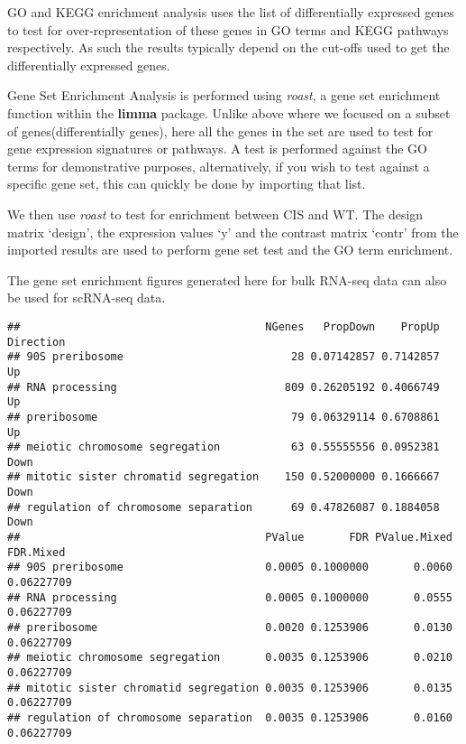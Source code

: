 \documentclass[
  openany]{book}
\newenvironment{Shaded}{\begin{snugshade}}{\end{snugshade}}
\newcommand{\AttributeTok}[1]{\textcolor[rgb]{0.77,0.63,0.00}{#1}}
\newcommand{\FunctionTok}[1]{\textcolor[rgb]{0.00,0.00,0.00}{#1}}
\newcommand{\NormalTok}[1]{#1}
\newcommand{\OtherTok}[1]{\textcolor[rgb]{0.56,0.35,0.01}{#1}}
\newcommand{\SpecialCharTok}[1]{\textcolor[rgb]{0.00,0.00,0.00}{#1}}
\begin{document}
GO and KEGG enrichment analysis uses the list of differentially expressed genes to test for over-representation of these genes in GO terms and KEGG pathways respectively. As such the results typically depend on the cut-offs used to get the differentially expressed genes.

Gene Set Enrichment Analysis is performed using \emph{roast}, a gene set enrichment function within the \textbf{limma} package. Unlike above where we focused on a subset of genes(differentially genes), here all the genes in the set are used to test for gene expression signatures or pathways. A test is performed against the GO terms for demonstrative purposes, alternatively, if you wish to test against a specific gene set, this can quickly be done by importing that list.

We then use \emph{roast} to test for enrichment between CIS and WT. The design matrix `design', the expression values `y' and the contrast matrix `contr' from the imported results are used to perform gene set test and the GO term enrichment.

The gene set enrichment figures generated here for bulk RNA-seq data can also be used for scRNA-seq data.

\begin{Shaded}
\end{Shaded}

\begin{verbatim}
##                                      NGenes   PropDown    PropUp Direction
## 90S preribosome                          28 0.07142857 0.7142857        Up
## RNA processing                          809 0.26205192 0.4066749        Up
## preribosome                              79 0.06329114 0.6708861        Up
## meiotic chromosome segregation           63 0.55555556 0.0952381      Down
## mitotic sister chromatid segregation    150 0.52000000 0.1666667      Down
## regulation of chromosome separation      69 0.47826087 0.1884058      Down
##                                      PValue       FDR PValue.Mixed  FDR.Mixed
## 90S preribosome                      0.0005 0.1000000       0.0060 0.06227709
## RNA processing                       0.0005 0.1000000       0.0555 0.06227709
## preribosome                          0.0020 0.1253906       0.0130 0.06227709
## meiotic chromosome segregation       0.0035 0.1253906       0.0210 0.06227709
## mitotic sister chromatid segregation 0.0035 0.1253906       0.0135 0.06227709
## regulation of chromosome separation  0.0035 0.1253906       0.0160 0.06227709
\end{verbatim}
\end{document}
